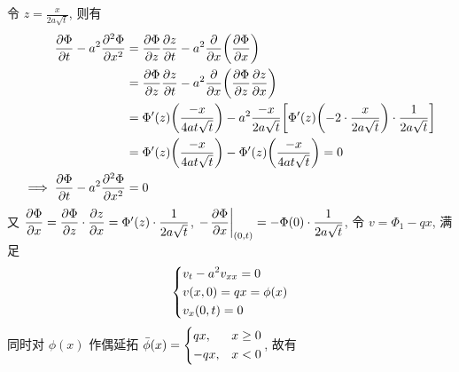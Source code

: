 \solution
令 $z = \frac{x}{2a\sqrt{t}}$, 则有
\[ \begin{aligned}
{\frac{\partial {\Phi}}{\partial {t}}} - a^2 {\frac{\partial {^2\Phi}}{\partial {x^2}}}
&= {\frac{\partial {\Phi}}{\partial {z}}} {\frac{\partial {z}}{\partial {t}}}
 - a^2 {{\frac{\partial {}}{\partial {x}}}}{\left( {{\frac{\partial {\Phi}}{\partial {x}}}} \right)} \\
&= {\frac{\partial {\Phi}}{\partial {z}}} {\frac{\partial {z}}{\partial {t}}}
 - a^2 {{\frac{\partial {}}{\partial {x}}}}{\left( {{\frac{\partial {\Phi}}{\partial {z}}}{\frac{\partial {z}}{\partial {x}}}} \right)} \\
&= \Phi'(z) {\left( {\frac{-x}{4at\sqrt{t}}} \right)}
 - a^2 \frac{-x}{2a\sqrt{t}} {\left[ {
  \Phi'(z) {\left( {-2 \cdot \frac{x}{2a\sqrt{t}}} \right)} \cdot \frac{1}{2a\sqrt{t}}
 } \right]} \\
&= \Phi'(z) {\left( {\frac{-x}{4at\sqrt{t}}} \right)}
 - \Phi'(z) {\left( {\frac{-x}{4at\sqrt{t}}} \right)} = 0\\
\implies {\frac{\partial {\Phi}}{\partial {t}}} - a^2 {\frac{\partial {^2\Phi}}{\partial {x^2}}} &= 0
\end{aligned} \]
又 ${\dfrac{\partial {\Phi}}{\partial {x}}} = {\dfrac{\partial {\Phi}}{\partial {z}}} \cdot {\dfrac{\partial {z}}{\partial {x}}}
= \Phi'(z) \cdot \dfrac{1}{2a\sqrt{t}}$,
$-{\left.{{\dfrac{\partial {\Phi}}{\partial {x}}}} \right|}_{(0, t)}=-\Phi(0)\cdot \dfrac{1}{2a\sqrt{t}}$,
令 $v = \Phi_1 - qx$, 满足
\[ \begin{dcases}
v_t - a^2 v_{xx} = 0 \\
v(x, 0) = qx = \phi(x) \\
v_x(0, t) = 0
\end{dcases} \]
同时对 $\phi(x)$ 作偶延拓
$\bar{\phi}(x) = \begin{dcases}qx,&x\geq0\\-qx,&x<0\end{dcases}$, 故有

